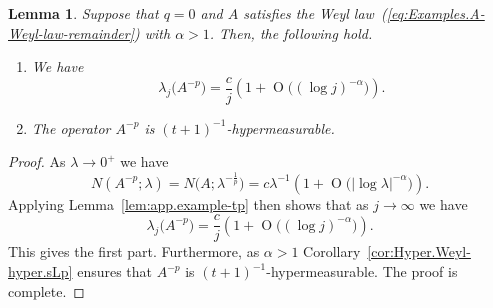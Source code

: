 \documentclass[10pt, a4paper]{amsart}
\newcommand{\op}{\operatorname}
\numberwithin{equation}{section}
\newtheorem{lemma}[theorem]{Lemma}
\theoremstyle{definition}
\theoremstyle{remark}
\begin{document}
\begin{lemma}\label{lem:Examples.NAL-remainder1}
 Suppose that $q=0$ and $A$ satisfies the Weyl law~(\ref{eq:Examples.A-Weyl-law-remainder}) with $\alpha>1$. Then, the following hold.
\begin{enumerate}
 \item[(i)] We have
 \begin{equation*}
  \lambda_j\big(A^{-p}\big) = \frac{c}{j}  \left( 1+ \op{O}\big((\log j)^{-\alpha}\big)\right).
\end{equation*}

\item[(ii)] The operator $A^{-p}$ is $(t+1)^{-1}$-hypermeasurable.
\end{enumerate}
\end{lemma}
\begin{proof}
As $\lambda \rightarrow 0^+$ we have
\begin{equation*}
   N\left(A^{-p};\lambda\right)= N\big(A;\lambda^{-\frac{1}{p}}\big) = c\lambda^{-1} \left( 1+ \op{O}\big(|\log \lambda|^{-\alpha}\big)\right).
\end{equation*}
Applying Lemma~\ref{lem:app.example-tp} then shows that as $j\rightarrow \infty$ we have
\begin{equation*}
  \lambda_j\big(A^{-p}\big) = \frac{c}{j}  \left( 1+ \op{O}\big((\log j)^{-\alpha}\big)\right).
\end{equation*}
This gives the first part. Furthermore, as $\alpha>1$ Corollary~\ref{cor:Hyper.Weyl-hyper.sLp} ensures that $A^{-p}$ is $(t+1)^{-1}$-hypermeasurable.  The proof is complete.
\end{proof}
\end{document}
